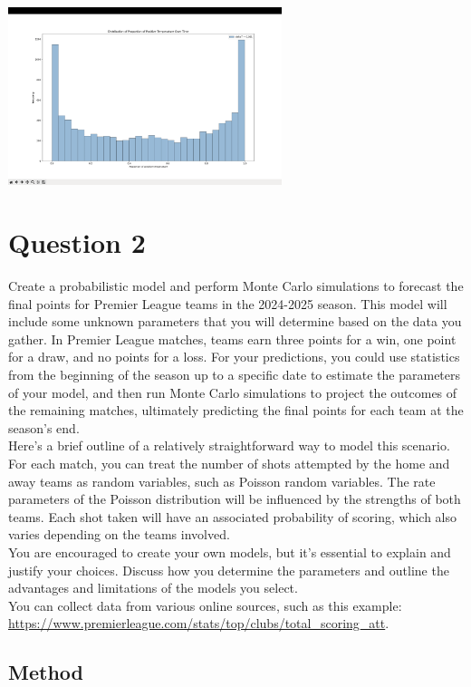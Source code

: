 \documentclass{article}
\begin{document}
\includegraphics[width=0.6\textwidth]{q1_p1_f3.png}\\

\newpage
\section*{Question 2}
Create a probabilistic model and perform Monte Carlo simulations to forecast the final points for Premier League teams in the 2024-2025 season. This model will include some unknown parameters that you will determine based on the data you gather. In Premier League matches, teams earn three points for a win, one point for a draw, and no points for a loss. For your predictions, you could use statistics from the beginning of the season up to a specific date to estimate the parameters of your model, and then run Monte Carlo simulations to project the outcomes of the remaining matches, ultimately predicting the final points for each team at the season's end.\\

Here's a brief outline of a relatively straightforward way to model this scenario. For each match, you can treat the number of shots attempted by the home and away teams as random variables, such as Poisson random variables. The rate parameters of the Poisson distribution will be influenced by the strengths of both teams. Each shot taken will have an associated probability of scoring, which also varies depending on the teams involved.\\

You are encouraged to create your own models, but it's essential to explain and justify your choices. Discuss how you determine the parameters and outline the advantages and limitations of the models you select.\\

You can collect data from various online sources, such as this example: \url{https://www.premierleague.com/stats/top/clubs/total_scoring_att}.

\subsection*{Method}
\end{document}
